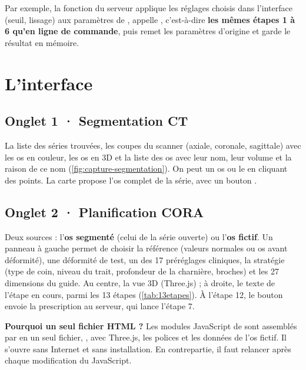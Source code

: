 Par exemple, la fonction  du serveur applique les réglages choisis dans l'interface (seuil, lissage)
aux paramètres de , appelle , c'est-à-dire \textbf{les mêmes étapes
1 à 6 qu'en ligne de commande}, puis remet les paramètres d'origine et garde le résultat en mémoire.

\section{L'interface}

\subsection{Onglet 1 · Segmentation CT}

La liste des séries trouvées, les coupes du scanner (axiale, coronale, sagittale) avec les os en couleur, les os en 3D
et la liste des os avec leur nom, leur volume et la raison de ce nom (\cref{fig:capture-segmentation}). On peut
 un os ou le  en cliquant des points. La carte  propose l'os complet
de la série, avec un bouton .


\subsection{Onglet 2 · Planification CORA}

Deux sources : l'\textbf{os segmenté} (celui de la série ouverte) ou l'\textbf{os fictif}. Un panneau à gauche permet
de choisir la référence (valeurs normales ou os avant déformité), une déformité de test, un des 17 préréglages
cliniques, la stratégie (type de coin, niveau du trait, profondeur de la charnière, broches) et les 27 dimensions du
guide. Au centre, la vue 3D (Three.js) ; à droite, le texte de l'étape en cours, parmi les 13 étapes
(\cref{tab:13etapes}). À l'étape 12, le bouton  envoie la prescription au serveur, qui
lance l'étape 7.

\begin{pourquoi}
\textbf{Pourquoi un seul fichier HTML ?} Les modules JavaScript de  sont assemblés par
 en un seul fichier, , avec
Three.js, les polices et les données de l'os fictif. Il s'ouvre sans Internet et sans installation. En contrepartie,
il faut relancer  après chaque modification du JavaScript.
\end{pourquoi}

